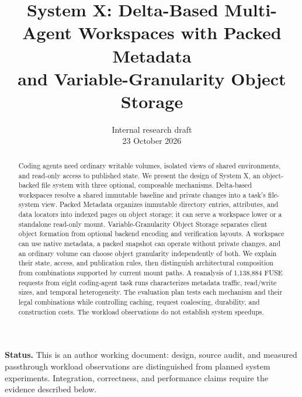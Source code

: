 \documentclass[letterpaper,twocolumn,10pt]{article}
\newcommand{\sysname}{System X}
\newcommand{\sysname}{BrewFS}
\begin{document}
\title{\sysname: Delta-Based Multi-Agent Workspaces with Packed Metadata\\
and Variable-Granularity Object Storage}
\author{Internal research draft\\23 October 2026}
\date{}
\maketitle
\begin{abstract}
Coding agents need ordinary writable volumes, isolated views of shared
environments, and read-only access to published state. We present the design
of \sysname, an object-backed file system with three optional, composable
mechanisms. Delta-based workspaces resolve a shared immutable baseline and
private changes into a task's file-system view. Packed Metadata organizes
immutable directory entries, attributes, and data locators into indexed pages
on object storage; it can serve a workspace lower or a standalone read-only
mount. Variable-Granularity Object Storage separates client object formation
from optional backend encoding and verification layouts. A workspace can use
native metadata, a packed snapshot can operate without private changes, and
an ordinary volume can choose object granularity independently of both.
We explain their state, access, and publication rules, then distinguish
architectural composition from combinations supported by current mount paths.
A reanalysis of 1,138,884 FUSE requests from eight coding-agent task runs
characterizes metadata traffic, read/write sizes, and temporal heterogeneity.
The evaluation plan tests each mechanism and their legal combinations while
controlling caching, request coalescing, durability, and construction costs.
The workload observations do not establish system speedups.
\end{abstract}

\noindent\textbf{Status.} This is an author working document: design, source
audit, and measured passthrough workload observations are distinguished from
planned system experiments. Integration,
correctness, and performance claims require the evidence described below.












\label{page:bodyend}


\end{document}

